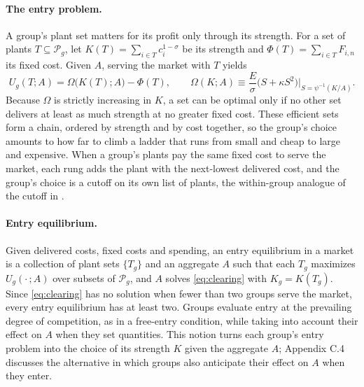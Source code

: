 \documentclass[11pt]{article}
\newcommand{\cP}{\mathcal P}
\begin{document}
\paragraph{The entry problem.} A group's plant set matters for its profit only through
its strength. For a set of plants $T\subseteq\cP_g$, let $K(T)=\sum_{i\in T}
c_i^{1-\sigma}$ be its strength and $\Phi(T)=\sum_{i\in T}F_{i,n}$ its fixed cost.
Given $A$, serving the market with $T$ yields
\begin{equation}
  U_g(T;A)=\Omega\bigl(K(T);A\bigr)-\Phi(T),
  \qquad
  \Omega(K;A)\equiv\frac{E}{\sigma}\bigl(S+\kappa S^2\bigr)\Big|_{S=\psi^{-1}(K/A)} .
  \label{eq:entrypayoff}
\end{equation}
Because $\Omega$ is strictly increasing in $K$, a set can be optimal only if no other set
delivers at least as much strength at no greater fixed cost. These efficient sets form a
chain, ordered by strength and by cost together, so the group's choice amounts to how
far to climb a ladder that runs from small and cheap to large and expensive. When a
group's plants pay the same fixed cost to serve the market, each rung adds the plant
with the next-lowest delivered cost, and the group's choice is a cutoff on its own list
of plants, the within-group analogue of the cutoff in \citet{GaubertItskhoki2021}.

\paragraph{Entry equilibrium.} Given delivered costs, fixed costs and spending, an
entry equilibrium in a market is a collection of plant sets $\{T_g\}$ and an aggregate
$A$ such that each $T_g$ maximizes $U_g(\cdot\,;A)$ over subsets of $\cP_g$, and $A$
solves \eqref{eq:clearing} with $K_g=K(T_g)$. Since \eqref{eq:clearing} has no solution
when fewer than two groups serve the market, every entry equilibrium has at least two.
Groups evaluate entry at the prevailing
degree of competition, as in a free-entry condition, while taking into account their
effect on $A$ when they set quantities. This notion turns each group's entry problem
into the choice of its strength $K$ given the aggregate $A$; Appendix C.4 discusses the
alternative in which groups also anticipate their effect on $A$ when they enter.
\end{document}
